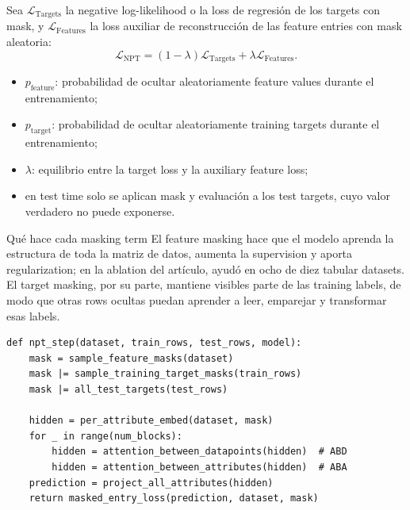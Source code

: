 Sea $\mathcal{L}_{\mathrm{Targets}}$ la negative log-likelihood o la loss de regresión de los targets con mask, y $\mathcal{L}_{\mathrm{Features}}$ la loss auxiliar de reconstrucción de las feature entries con mask aleatoria:
\[
\mathcal{L}_{\mathrm{NPT}}
=(1-\lambda)\mathcal{L}_{\mathrm{Targets}}
+\lambda\mathcal{L}_{\mathrm{Features}}.
\]

\begin{itemize}
  \item $p_{\mathrm{feature}}$: probabilidad de ocultar aleatoriamente feature values durante el entrenamiento;
  \item $p_{\mathrm{target}}$: probabilidad de ocultar aleatoriamente training targets durante el entrenamiento;
  \item $\lambda$: equilibrio entre la target loss y la auxiliary feature loss;
  \item en test time solo se aplican mask y evaluación a los test targets, cuyo valor verdadero no puede exponerse.
\end{itemize}

\begin{knowledgebox}{Qué hace cada masking term}
El feature masking hace que el modelo aprenda la estructura de toda la matriz de datos, aumenta la supervision y aporta regularization; en la ablation del artículo, ayudó en ocho de diez tabular datasets. El target masking, por su parte, mantiene visibles parte de las training labels, de modo que otras rows ocultas puedan aprender a leer, emparejar y transformar esas labels.
\end{knowledgebox}


\begin{lstlisting}[caption={Pseudocódigo conceptual del forward de NPT y de la mask aleatoria.}]
def npt_step(dataset, train_rows, test_rows, model):
    mask = sample_feature_masks(dataset)
    mask |= sample_training_target_masks(train_rows)
    mask |= all_test_targets(test_rows)

    hidden = per_attribute_embed(dataset, mask)
    for _ in range(num_blocks):
        hidden = attention_between_datapoints(hidden)  # ABD
        hidden = attention_between_attributes(hidden)  # ABA
    prediction = project_all_attributes(hidden)
    return masked_entry_loss(prediction, dataset, mask)
\end{lstlisting}

